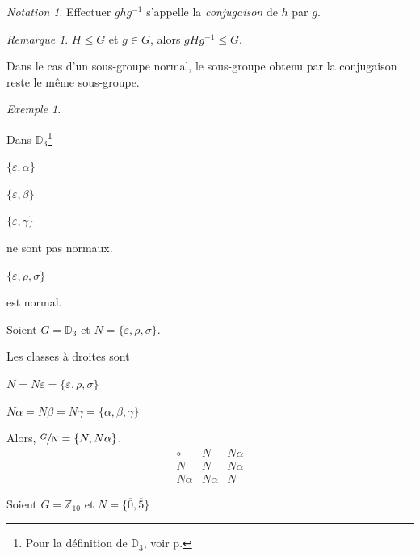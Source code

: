 \documentclass{report}
\newcommand*{\lte}{\leqslant}
\newcommand*{\entiers}{\mathbb{Z}}
\theoremstyle{definition}
\theoremstyle{remark}
\newtheorem*{exem}{Exemple}
\newtheorem*{nota}{Notation}
\newtheorem*{rema}{Remarque}
\begin{document}
	
	\begin{nota}
		Effectuer $ghg^{-1}$ s'appelle la \emph{conjugaison} de $h$ par $g$.
	\end{nota}
	\begin{rema}
		$H \lte G$ et $g \in G$, alors $gHg^{-1} \lte G$.

		Dans le cas d'un sous-groupe normal, le sous-groupe obtenu par la conjugaison reste le m\^eme sous-groupe.
	\end{rema}
	\begin{exem}~

		\begin{ulist}
			\item Dans $\mathbb{D}_3$\footnote{Pour la d\'efinition de $\mathbb{D}_3$, voir p.\pageref{D3}}
			\begin{ulist}
				\item $\{\varepsilon, \alpha\}$
				\item $\{\varepsilon, \beta\}$
				\item $\{\varepsilon, \gamma\}$
			\end{ulist}
			ne sont pas normaux.
			\begin{ulist}
				\item $\{\varepsilon, \rho, \sigma\}$
			\end{ulist}
			est normal.
			\item Soient $G = \mathbb{D}_3$ et $N=\{\varepsilon, \rho, \sigma\}$.

			Les classes \`a droites sont
			\begin{ulist}
				\item $N = N\varepsilon = \{\varepsilon, \rho, \sigma\}$
				\item $N\alpha = N\beta = N\gamma = \{\alpha, \beta, \gamma\}$
			\end{ulist}

			Alors, $\sfrac{G}{N} = \{N, N\alpha\}$.
			\renewcommand{\arraystretch}{1.2}
			\[
			\begin{array}{c||c|c}
				\circ&N&N\alpha\\
				\hline\hline
				N&N&N\alpha\\
				\hline
				N\alpha&N\alpha&N
			\end{array}
			\]
			\renewcommand{\arraystretch}{1}
			\item Soient $G=\entiers_{10}$ et $N=\{\overline0,\overline5\}$


\end{ulist}
\end{exem}
\end{document}
